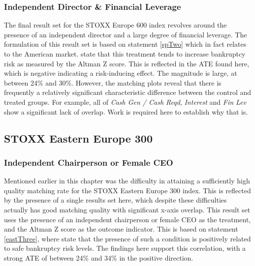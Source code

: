 \subsubsection{Independent Director \& Financial Leverage}
{The final result set for the STOXX Europe 600 index revolves around the presence of an independent director and a large degree of financial leverage. The formulation of this result set is based on statement \ref{spTwo} which in fact relates to the American market. \cite{moldovan2015learning} state that this treatment tends to increase bankruptcy risk as measured by the Altman Z score. This is reflected in the ATE found here, which is negative indicating a risk-inducing effect. The magnitude is large, at between 24\% and 30\%. However, the matching plots reveal that there is frequently a relatively significant characteristic difference between the control and treated groups. For example, all of {\it Cash Gen / Cash Reqd}, {\it Interest} and {\it Fin Lev} show a significant lack of overlap. Work is required here to establish why that is. }
\subsection{STOXX Eastern Europe 300}
\subsubsection{Independent Chairperson or Female CEO}
{Mentioned earlier in this chapter was the difficulty in attaining a sufficiently high quality matching rate for the STOXX Eastern Europe 300 index. This is reflected by the presence of a single results set here, which despite these difficulties actually has good matching quality with significant x-axis overlap. This result set uses the presence of an independent chairperson or female CEO as the treatment, and the Altman Z score as the outcome indicator. This is based on statement \ref{eastThree}, where \cite{moldovan2015learning} state that the presence of such a condition is positively related to safe bankruptcy risk levels. The findings here support this correlation, with a strong ATE of between 24\% and 34\% in the positive direction. }
